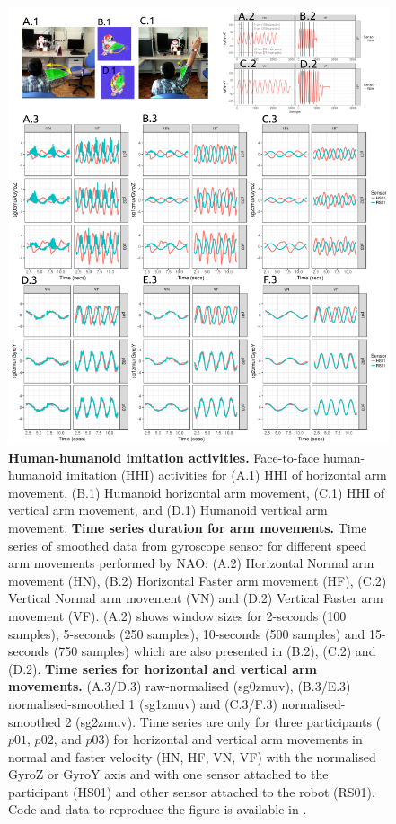 \documentclass[fleqn,10pt]{wlscirep}
\begin{document}
\begin{figure}[ht]
  \centering
\includegraphics[width=1.0\textwidth]{figures/fig02/versions/drawing-v00.png}
    \caption{
	{\bf Human-humanoid imitation activities.} 
		Face-to-face human-humanoid imitation (HHI) activities for (A.1) HHI of horizontal arm movement, (B.1) Humanoid horizontal arm movement, (C.1) HHI of vertical arm movement, and (D.1) Humanoid vertical arm movement.
	{\bf Time series duration for arm movements.}
    	Time series of smoothed data from gyroscope sensor for different speed arm movements performed by NAO: (A.2) Horizontal Normal arm movement (HN), (B.2) Horizontal Faster arm movement (HF), (C.2) Vertical Normal arm movement (VN) and (D.2) Vertical Faster arm movement (VF).
		(A.2) shows window sizes for 2-seconds (100 samples), 5-seconds (250 samples), 10-seconds (500 samples) and 15-seconds (750 samples) which are also presented in (B.2), (C.2) and (D.2).
	{\bf Time series for horizontal and vertical arm movements.}
		(A.3/D.3) raw-normalised (sg0zmuv), (B.3/E.3) normalised-smoothed 1 (sg1zmuv) and (C.3/F.3) normalised-smoothed 2 (sg2zmuv).
		Time series are only for three participants	($p01$, $p02$, and $p03$) for horizontal and vertical arm movements in normal and faster velocity (HN, HF, VN, VF) with the normalised GyroZ or GyroY axis and with one sensor attached to the participant (HS01) and other sensor attached to the robot (RS01).
	Code and data to reproduce the figure is available in \cite{srep2021}.
}
    \label{fig02}
\end{figure}
\end{document}
